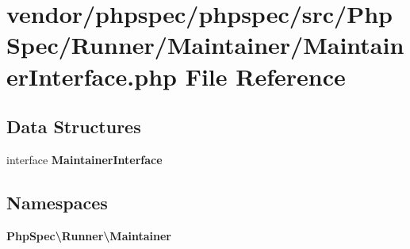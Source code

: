 \section{vendor/phpspec/phpspec/src/\+Php\+Spec/\+Runner/\+Maintainer/\+Maintainer\+Interface.php File Reference}
\label{_maintainer_interface_8php}
\subsection*{Data Structures}
\begin{DoxyCompactItemize}
\item 
interface {\bf Maintainer\+Interface}
\end{DoxyCompactItemize}
\subsection*{Namespaces}
\begin{DoxyCompactItemize}
\item 
 {\bf Php\+Spec\textbackslash{}\+Runner\textbackslash{}\+Maintainer}
\end{DoxyCompactItemize}

